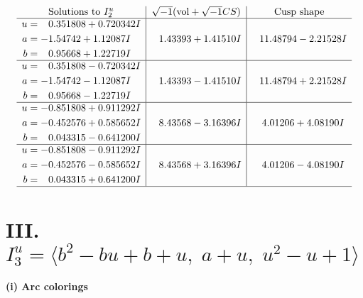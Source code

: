 \documentclass[1p]{elsarticle_modified}
\theoremstyle{definition}
\newcommand{\I}{\sqrt{-1}}
\begin{document}
$$\begin{array}{c|c|c}  
\text{Solutions to }I^u_{2}& \I (\text{vol} + \sqrt{-1}CS) & \text{Cusp shape}\\
 \hline 
\begin{aligned}
u &= \phantom{-}0.351808 + 0.720342 I \\
a &= -1.54742 + 1.12087 I \\
b &= \phantom{-}0.95668 + 1.22719 I\end{aligned}
 & \phantom{-}1.43393 + 1.41510 I & \phantom{-}11.48794 - 2.21528 I \\ \hline\begin{aligned}
u &= \phantom{-}0.351808 - 0.720342 I \\
a &= -1.54742 - 1.12087 I \\
b &= \phantom{-}0.95668 - 1.22719 I\end{aligned}
 & \phantom{-}1.43393 - 1.41510 I & \phantom{-}11.48794 + 2.21528 I \\ \hline\begin{aligned}
u &= -0.851808 + 0.911292 I \\
a &= -0.452576 + 0.585652 I \\
b &= \phantom{-}0.043315 - 0.641200 I\end{aligned}
 & \phantom{-}8.43568 - 3.16396 I & \phantom{-}4.01206 + 4.08190 I \\ \hline\begin{aligned}
u &= -0.851808 - 0.911292 I \\
a &= -0.452576 - 0.585652 I \\
b &= \phantom{-}0.043315 + 0.641200 I\end{aligned}
 & \phantom{-}8.43568 + 3.16396 I & \phantom{-}4.01206 - 4.08190 I\\
 \hline 
 \end{array}$$\newpage\newpage\renewcommand{\arraystretch}{1}
\centering \section*{III. $I^u_{3}= \langle b^2- b u+b+u,\;a+u,\;u^2- u+1 \rangle$}
\flushleft \textbf{(i) Arc colorings}\\
\end{document}
